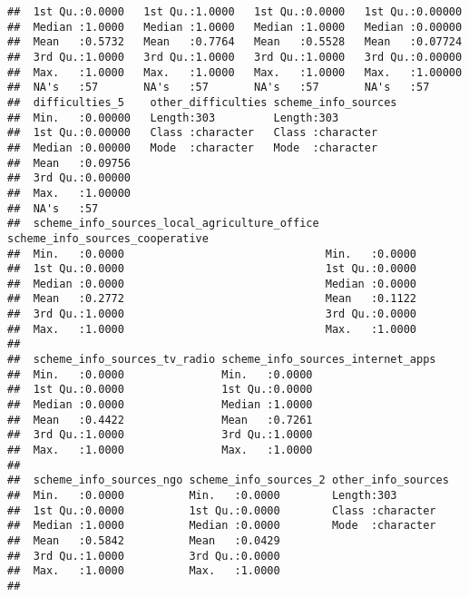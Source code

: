 \documentclass[
]{article}
\begin{document}
\begin{verbatim}
##  1st Qu.:0.0000   1st Qu.:1.0000   1st Qu.:0.0000   1st Qu.:0.00000  
##  Median :1.0000   Median :1.0000   Median :1.0000   Median :0.00000  
##  Mean   :0.5732   Mean   :0.7764   Mean   :0.5528   Mean   :0.07724  
##  3rd Qu.:1.0000   3rd Qu.:1.0000   3rd Qu.:1.0000   3rd Qu.:0.00000  
##  Max.   :1.0000   Max.   :1.0000   Max.   :1.0000   Max.   :1.00000  
##  NA's   :57       NA's   :57       NA's   :57       NA's   :57       
##  difficulties_5    other_difficulties scheme_info_sources
##  Min.   :0.00000   Length:303         Length:303         
##  1st Qu.:0.00000   Class :character   Class :character   
##  Median :0.00000   Mode  :character   Mode  :character   
##  Mean   :0.09756                                         
##  3rd Qu.:0.00000                                         
##  Max.   :1.00000                                         
##  NA's   :57                                              
##  scheme_info_sources_local_agriculture_office scheme_info_sources_cooperative
##  Min.   :0.0000                               Min.   :0.0000                 
##  1st Qu.:0.0000                               1st Qu.:0.0000                 
##  Median :0.0000                               Median :0.0000                 
##  Mean   :0.2772                               Mean   :0.1122                 
##  3rd Qu.:1.0000                               3rd Qu.:0.0000                 
##  Max.   :1.0000                               Max.   :1.0000                 
##                                                                              
##  scheme_info_sources_tv_radio scheme_info_sources_internet_apps
##  Min.   :0.0000               Min.   :0.0000                   
##  1st Qu.:0.0000               1st Qu.:0.0000                   
##  Median :0.0000               Median :1.0000                   
##  Mean   :0.4422               Mean   :0.7261                   
##  3rd Qu.:1.0000               3rd Qu.:1.0000                   
##  Max.   :1.0000               Max.   :1.0000                   
##                                                                
##  scheme_info_sources_ngo scheme_info_sources_2 other_info_sources
##  Min.   :0.0000          Min.   :0.0000        Length:303        
##  1st Qu.:0.0000          1st Qu.:0.0000        Class :character  
##  Median :1.0000          Median :0.0000        Mode  :character  
##  Mean   :0.5842          Mean   :0.0429                          
##  3rd Qu.:1.0000          3rd Qu.:0.0000                          
##  Max.   :1.0000          Max.   :1.0000                          
##                                                                  

\end{verbatim}
\end{document}
